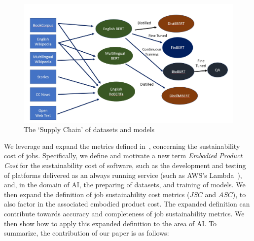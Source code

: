 {    \begin{figure}[!t]
        \centering
        \includegraphics[width = \linewidth]{Figures/sustain1.jpg}
        \caption{The `Supply Chain' of datasets and models}
        \label{fig:model_supply_chain}
    \end{figure} 
    
    We leverage and expand the metrics defined in~\cite{Gandhi2022}, concerning the sustainability cost of jobs. Specifically, we define and motivate a new term \textit{Embodied Product Cost} for the sustainability cost of software, such as the development and testing of platforms delivered as an always running service (such as AWS's Lambda~\cite{Lambda}), and, in the domain of AI, the preparing of datasets, and training of models. We then expand the definition of job sustainability cost metrics ($JSC$ and $ASC$), to also factor in the associated embodied product cost. The expanded definition can contribute towards accuracy and completeness of job sustainability metrics. We then show how to apply this expanded definition to the area of AI. To summarize, the contribution of our paper is as follows:
    
}
